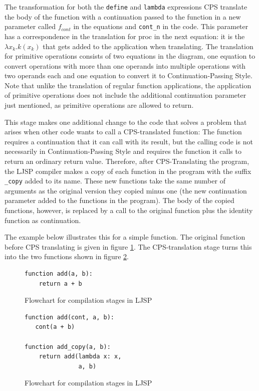 \documentclass[11pt]{report}
\begin{document}
The transformation for both the \texttt{define} and \texttt{lambda} expressions CPS translate the body of the function with a continuation passed to the function in a new parameter called $f_{cont}$ in the equations and \texttt{cont_n} in the code. This parameter has a correspondence in the translation for proc in the next equation: it is the $\lambda x_k.k(x_k)$ that gets added to the application when translating. The translation for primitive operations consists of two equations in the diagram, one equation to convert operations with more than one operands into multiple operations with two operands each and one equation to convert it to Continuation-Passing Style. Note that unlike the translation of regular function applications, the application of primitive operations does not include the additional continuation parameter just mentioned, as primitive operations are allowed to return.

This stage makes one additional change to the code that solves a problem that arises when other code wants to call a CPS-translated function: The function requires a continuation that it can call with its result, but the calling code is not necessarily in Continuation-Passing Style and requires the function it calls to return an ordinary return value. Therefore, after CPS-Translating the program, the LJSP compiler makes a copy of each function in the program with the suffix \texttt{_copy} added to its name. These new functions take the same number of arguments as the original version they copied minus one (the new continuation parameter added to the functions in the program). The body of the copied functions, however, is replaced by a call to the original function plus the identity function as continuation. 

The example below illustrates this for a simple function. The original function before CPS translating is given in figure \ref{cpsdetail1}. The CPS-translation stage turns this into the two functions shown in figure \ref{cpsdetail2}.

\begin{figure}[ht]
\begin{lstlisting}
function add(a, b):
    return a + b
\end{lstlisting}
\caption{Flowchart for compilation stages in LJSP}
\label{cpsdetail1}
\end{figure}

\begin{figure}[ht]
\begin{lstlisting}
function add(cont, a, b):
   cont(a + b)
   
function add_copy(a, b):
    return add(lambda x: x, 
               a, b)
\end{lstlisting}
\caption{Flowchart for compilation stages in LJSP}
\label{cpsdetail2}
\end{figure}
\end{document}
